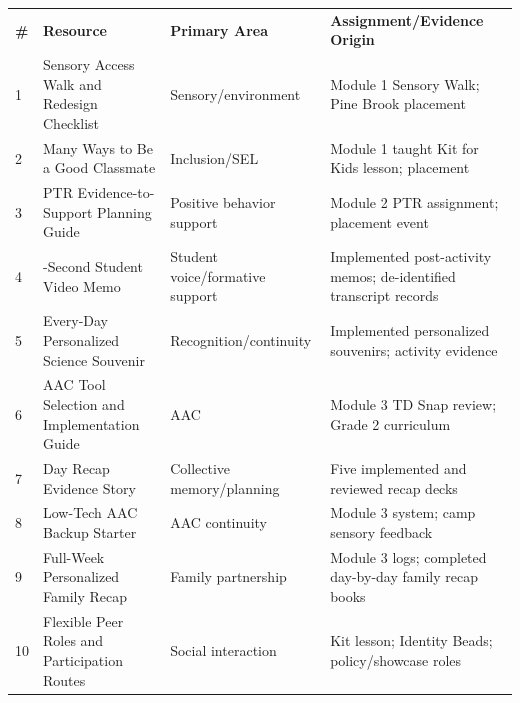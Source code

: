 \documentclass[11pt]{article}
\begin{document}
\vfill
\tableofcontents
\vfill



\clearpage
{}

\vfill
\setlength{\tabcolsep}{4pt}

\setlength{\arrayrulewidth}{0.75pt}

\begin{longtable}{
  >{\centering\arraybackslash}p{0.1in}
  >{\RaggedRight\arraybackslash}p{2.40in}
  >{\RaggedRight\arraybackslash}p{1.80in}
  >{\RaggedRight\arraybackslash}p{2.50in}
}

\rowcolor{DeepNavy}
\color{white}\bfseries \# &
\color{white}\bfseries Resource &
\color{white}\bfseries Primary Area &
\color{white}\bfseries Assignment/Evidence Origin \\

\rowcolor{MapAccess}
1 & Sensory Access Walk and Redesign Checklist & Sensory/environment & Module 1 Sensory Walk; Pine Brook placement \\
\hline

\rowcolor{MapAccess}
2 & Many Ways to Be a Good Classmate & Inclusion/SEL & Module 1 taught Kit for Kids lesson; placement \\
\hline

\rowcolor{MapAccess}
3 & PTR Evidence-to-Support Planning Guide & Positive behavior support & Module 2 PTR assignment; placement event \\
\hline

\rowcolor{MapEvidence}
4 & 30-Second Student Video Memo & Student voice/formative support & Implemented post-activity memos; de-identified transcript records \\
\hline

\rowcolor{MapEvidence}
5 & Every-Day Personalized Science Souvenir & Recognition/continuity & Implemented personalized souvenirs; activity evidence \\
\hline

\rowcolor{MapRoutes}
6 & AAC Tool Selection and Implementation Guide & AAC & Module 3 TD Snap review; Grade 2 curriculum \\
\hline

\rowcolor{MapAction}
7 & Day Recap Evidence Story & Collective memory/planning & Five implemented and reviewed recap decks \\
\hline

\rowcolor{MapRoutes}
8 & Low-Tech AAC Backup Starter & AAC continuity & Module 3 system; camp sensory feedback \\
\hline

\rowcolor{MapAction}
9 & Full-Week Personalized Family Recap & Family partnership & Module 3 logs; completed day-by-day family recap books \\\hline

\rowcolor{MapRoutes}
10 & Flexible Peer Roles and Participation Routes & Social interaction & Kit lesson; Identity Beads; policy/showcase roles \\\hline

\end{longtable}
\normalsize
\end{document}
